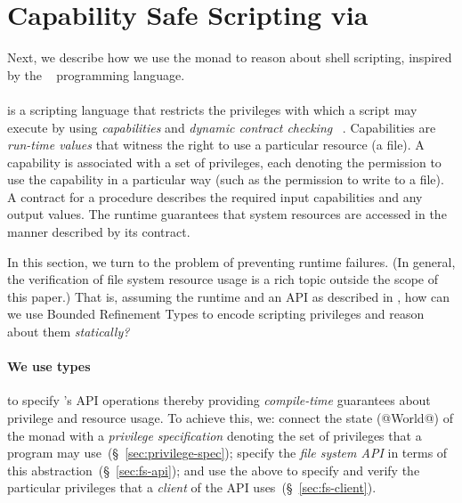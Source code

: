 \section{Capability Safe Scripting via \RIO}
\label{sec:files}\label{subsec:state:files}


Next, we describe how we use the \RIO monad to reason about shell
scripting, inspired by the \shill~\citep{shill} programming language.
%

\paragraph{\shill} is a scripting language that restricts the
privileges with which a script may execute by using
\emph{capabilities} and \emph{dynamic contract checking}~\citep{shill} .
%
Capabilities are \emph{run-time values} 
that witness the right to use a particular resource 
(\eg a file).
%
A capability is associated with a set of privileges, 
each denoting the permission to use the capability 
in a particular way (such as the permission to write 
to a file).
%
A contract for a \shill procedure describes the 
required input capabilities and any output values.
%
The \shill runtime guarantees that system resources are accessed in
the manner described by its contract.

In this section, we turn to the problem of
preventing \shill runtime failures.
%
(In general, the verification of file system resource usage is a rich
topic outside the scope of this paper.)
%
That is, assuming the \shill runtime and an API as described in
\cite{shill}, how can we use Bounded Refinement Types to encode
scripting privileges and reason about them \emph{statically?}

\paragraph{We use \RIO types} to specify \shill 's API operations
%
thereby providing \emph{compile-time} guarantees 
about privilege and resource usage.
%
To achieve this, we:
%
connect the state (@World@) of the \RIO monad with a
\emph{privilege specification} denoting the set of 
privileges that a program may use~(\S~\ref{sec:privilege-spec});
%
specify the \emph{file system API} in terms of this
abstraction~(\S~\ref{sec:fs-api});
%
and use the above to specify and verify the particular 
privileges that a \emph{client} of the API uses~(\S~\ref{sec:fs-client}).

